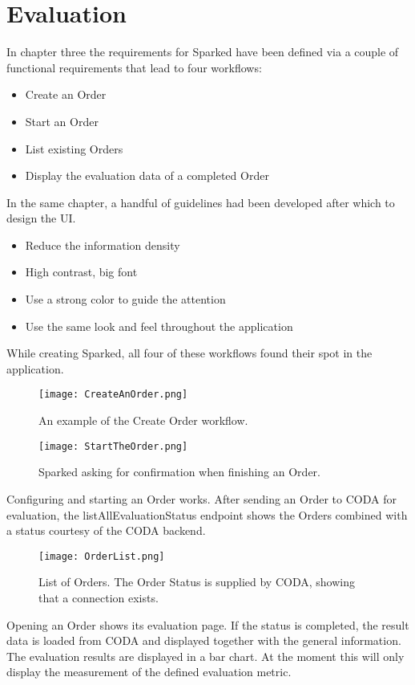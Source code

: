 \chapter{Evaluation}

In chapter three the requirements for Sparked have been defined via a couple of functional requirements that lead to four workflows:
\begin{itemize}
\item Create an Order
\item Start an Order
\item List existing Orders
\item Display the evaluation data of a completed Order
\end{itemize}

In the same chapter, a handful of guidelines had been developed after which to design the UI.
\begin{itemize}
\item Reduce the information density
\item High contrast, big font
\item Use a strong color to guide the attention 
\item Use the same look and feel throughout the application
\end{itemize}

While creating Sparked, all four of these workflows found their spot in the application. 
 
\begin{figure}
	\texttt{[image: CreateAnOrder.png]}
	\caption{An example of the Create Order workflow.}
\end{figure}

\begin{figure}
	\texttt{[image: StartTheOrder.png]}
	\caption{Sparked asking for confirmation when finishing an Order.}
\end{figure}

Configuring and starting an Order works. After sending an Order to CODA for evaluation, the listAllEvaluationStatus endpoint shows the Orders combined with a status courtesy of the CODA backend.

\begin{figure}
	\texttt{[image: OrderList.png]}
	\caption{List of Orders. The Order Status is supplied by CODA, showing that a connection exists.}
\end{figure}

Opening an Order shows its evaluation page. If the status is completed, the result data is loaded from CODA and displayed together with the general information. The evaluation results are displayed in a bar chart. At the moment this will only display the measurement of the defined evaluation metric. 

